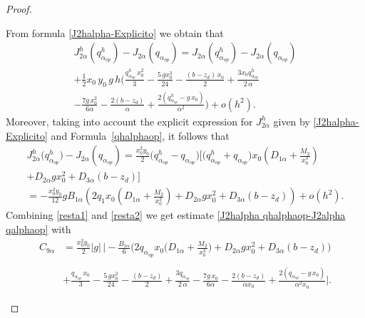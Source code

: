 \documentclass[11pt]{article}
\begin{document}
\begin{proof}
\begin{itemize}
From formula \eqref{J2halpha-Explicito} we obtain that
    \begin{equation}\label{resta1}
    \begin{array}{ll}
    { J^h_{2 \alpha}}({ q^h_{\alpha_{op}}})-J_{2\alpha}(q_{\alpha_{op}})=    J_{2\alpha}({ q^h_{\alpha_{op}}})-J_{2\alpha}(q_{\alpha_{op}}) \\[0.45cm]
    + \tfrac{1}{2} x_0\,y_0 \,g \,h \Big(   \tfrac{ { q^h_{\alpha_{op}}}\,x_0^2}{3}   - \tfrac{5\,g x_0^3}{24}  - \tfrac{(b-z_d)\,x_0}{2} 
    + \tfrac{3 x_0 { q^h_{\alpha_{op}}}}{2\,\alpha}\\[0.45cm]
    - \tfrac{7 g\,x_0^2}{6\alpha} - \tfrac{2(b-z_d)}{\alpha}+ \tfrac{2({ q^h_{\alpha_{op}}}-g\,x_0)}{\alpha^2}\Big)+o(h^2).
    \end{array}
    \end{equation}
Moreover, taking into account the explicit expression for ${J^h_{2\alpha}}$ given by  \eqref{J2halpha-Explicito} and \mbox{Formula~\eqref{qhalphaop}}, it follows that
\begin{equation}\label{resta2}
    \begin{array}{ll}
  {  J^h_{2\alpha}( q^h_{\alpha_{op}}})-J_{2\alpha}(q_{\alpha_{op}})= \frac{x_0^2 y_0}{2}\big({ q^h_{\alpha_{op}}}-q_{\alpha_{op}}\big) \Big[\big({ q^h_{\alpha_{op}}}+q_{\alpha_{op}}\big)x_0  \left(D_{1\alpha}+\tfrac{M_2}{x_0^3} \right)\\
    + D_{2\alpha}g x_0^2+D_{3\alpha}(b-z_d) \Big]\\
=-\frac{x_0^2 y_0}{12}  g B_{1\alpha}  \left(2q_1 x_0 \left(D_{1\alpha}+\frac{M_2}{x_0^3}\right)+D_{2\alpha} g x_0^2+D_{3\alpha} (b-z_d)\right)+o(h^2).
    \end{array}
\end{equation}    
    Combining \eqref{resta1} and \eqref{resta2} we get estimate \eqref{J2halpha qhalphaop-J2alpha qalphaop} with 
    \begin{equation*}
      \begin{array}{ll}
     C_{9\alpha}&=\frac{x_0^2 y_0}{2} |g| \,\Big| -\frac{B_{1\alpha}}{6}\Big(2 q_{\alpha_{op}} x_0 \Big(  D_{1\alpha}+\frac{M_2}{x_0^3}\Big)+D_{2\alpha}gx_0^2+D_{3\alpha}(b-z_d) \Big)\\
     \\
    & +  \frac{ q_{\alpha_{op}}\,x_0}{3}   - \frac{5\,g x_0^2}{24}  - \frac{(b-z_d)}{2} 
     + \frac{3  q_{\alpha_{op}}}{2\,\alpha} - \frac{7 g\,x_0}{6\alpha} - \frac{2(b-z_d)}{\alpha x_0}+ \frac{2(q_{\alpha_{op}}-g\,x_0)}{\alpha^2 x_0}\Big|.
     \end{array}
    \end{equation*}


\end{itemize}
\end{proof}
\end{document}
